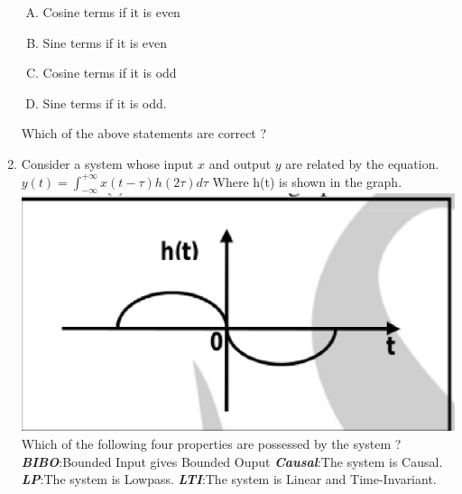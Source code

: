 \documentclass[journal,12pt,twocolumn]{IEEEtran}
\begin{document}
\begin{enumerate}[1.]
\begin{enumerate}[(P)]
\item Cosine terms if it is even
\item Sine terms if it is even
\item Cosine terms if it is odd
\item Sine terms if it is odd.

\end{enumerate}
Which of the above statements are correct ?
\begin{enumerate}[(A)]
\end{enumerate}

\item Consider a system whose input $x$ and output $y$ are related by the equation. 
\newline$y(t)=\int_{-\infty}^{+\infty}x(t-\tau)h(2\tau)d\tau$
Where h(t) is shown in the graph.\\
\includegraphics[scale=0.4]{fig9.eps}
\newline Which of the following four properties are possessed by the system ?
\newline \textbf{\textit{BIBO}}:Bounded Input gives Bounded Ouput
\newline \textbf{\textit{Causal}}:The system is Causal.
\newline \textbf{\textit{LP}}:The system is Lowpass.
\newline \textbf{\textit{LTI}}:The system is Linear and Time-Invariant.\\
\begin{enumerate}[(A)]
\begin{multicols}{2}
\setlength\itemsep{1em}


\end{multicols}
\end{enumerate}
\end{enumerate}
\end{document}
